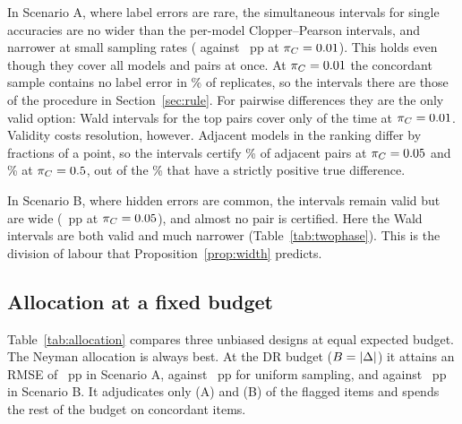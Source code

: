 In Scenario A, where label errors are rare, the simultaneous intervals for single accuracies are no wider than the per-model Clopper--Pearson intervals, and narrower at small sampling rates (\simWidthOneA{} against \cpWidthOneA~pp at $\pi_C=0.01$). This holds even though they cover all models and pairs at once. At $\pi_C=0.01$ the concordant sample contains no label error in \simNoErrOneA\% of replicates, so the intervals there are those of the procedure in Section~\ref{sec:rule}. For pairwise differences they are the only valid option: Wald intervals for the top pairs cover only \waldPairCovOneA{} of the time at $\pi_C=0.01$. Validity costs resolution, however. Adjacent models in the ranking differ by fractions of a point, so the intervals certify \simCertFiveA\% of adjacent pairs at $\pi_C=0.05$ and \simCertHalfA\% at $\pi_C=0.5$, out of the \simTrueCertA\% that have a strictly positive true difference.

In Scenario B, where hidden errors are common, the intervals remain valid but are wide (\simWidthFiveB~pp at $\pi_C=0.05$), and almost no pair is certified. Here the Wald intervals are both valid and much narrower (Table~\ref{tab:twophase}). This is the division of labour that Proposition~\ref{prop:width} predicts.

\subsection{Allocation at a fixed budget}
\label{sec:emp-alloc}

\begin{table}[t]
\centering
\scriptsize

\caption{RMSE (pp, exact design variance averaged over models) at expected budget $B$ adjudications, expressed as a multiple of the DR budget $|\Dset|$. Designs: uniform random sampling of all items; two-phase with every discordant item adjudicated ($\pi_\Dset=1$, only possible when $B>|\Dset|$); and the Neyman allocation of Proposition~\ref{prop:neyman}, computed with oracle stratum error rates.}
\label{tab:allocation}
\end{table}

Table~\ref{tab:allocation} compares three unbiased designs at equal expected budget. The Neyman allocation is always best. At the DR budget ($B=|\Delta|$) it attains an RMSE of \allocNeyOneA~pp in Scenario A, against \allocUnifOneA~pp for uniform sampling, and \allocNeyOneB{} against \allocUnifOneB~pp in Scenario B. It adjudicates only \allocNeyPiDOneA{} (A) and \allocNeyPiDOneB{} (B) of the flagged items and spends the rest of the budget on concordant items.

